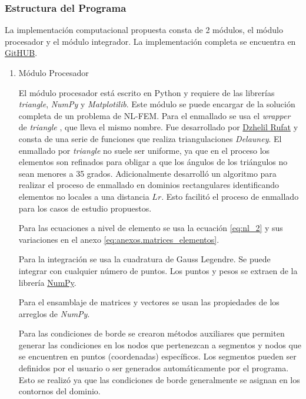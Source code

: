 		\subsubsection{Estructura del Programa}
		La implementación computacional propuesta consta de 2 módulos, el módulo procesador y el módulo integrador. La implementación completa se encuentra en \href{https://github.com/ZibraMax/NLFEM}{GitHUB}. 
			\begin{enumerate}
				\item Módulo Procesador

				El módulo procesador está escrito en Python y requiere de las librerías \textit{triangle}, \textit{NumPy} y \textit{Matplotilib}. Este módulo se puede encargar de la solución completa de un problema de NL-FEM.
				Para el enmallado se usa el \textit{wrapper} de \textit{triangle} \parencite{triangle}, que lleva el mismo nombre. Fue desarrollado por \href{https://rufat.be/index.html}{Dzhelil Rufat} y consta de una serie de funciones que realiza triangulaciones \textit{Delauney}. El enmallado por \textit{triangle} no suele ser uniforme, ya que en el proceso los elementos son refinados para obligar a que los ángulos de los triángulos no sean menores a 35 grados.
				Adicionalmente \textcite{ProgramaEnmallado} desarrolló un algoritmo para realizar el proceso de enmallado en dominios rectangulares identificando elementos no locales a una distancia $Lr$. Esto facilitó el proceso de enmallado para los casos de estudio propuestos.

				Para las ecuaciones a nivel de elemento se usa la ecuación \ref{eq:nl_2} y sus variaciones en el anexo \ref{eq:anexos.matrices_elementos}.

				Para la integración se usa la cuadratura de Gauss Legendre. Se puede integrar con cualquier número de puntos. Los puntos y pesos se extraen de la librería \href{https://numpy.org/doc/stable/reference/generated/numpy.polynomial.legendre.leggauss.html}{NumPy}.

				Para el ensamblaje de matrices y vectores se usan las propiedades de los arreglos de \textit{NumPy}.

				Para las condiciones de borde se crearon métodos auxiliares que permiten generar las condiciones en los nodos que pertenezcan a segmentos y nodos que se encuentren en puntos (coordenadas) específicos. Los segmentos pueden ser definidos por el usuario o ser generados automáticamente por el programa. Esto se realizó ya que las condiciones de borde generalmente se asignan en los contornos del dominio.
				

\end{enumerate}
